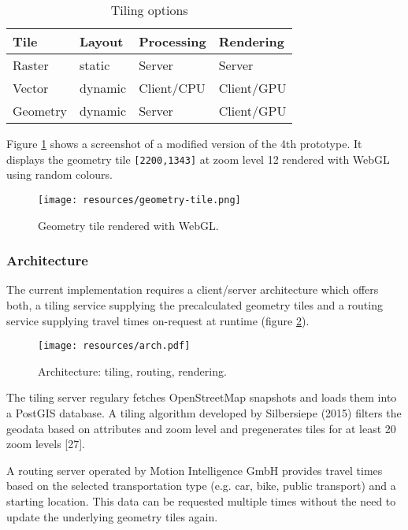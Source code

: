 \documentclass{motivation}
\begin{document}
  \begin{table}[!h]
    \centering
    \begin{tabular}{l|l|l|l}
      Tile & Layout & Processing & Rendering\\ \hline
      \cellcolor{yellow!15}Raster & \cellcolor{red!15}static & \cellcolor{green!15}Server & \cellcolor{red!15}Server\\
      \cellcolor{yellow!15}Vector & \cellcolor{green!15}dynamic & \cellcolor{red!15}Client/CPU & \cellcolor{green!15}Client/GPU\\
      \cellcolor{green!15}Geometry & \cellcolor{green!15}dynamic & \cellcolor{green!15}Server & \cellcolor{green!15}Client/GPU\\
    \end{tabular}
    \caption{Tiling options}
    \label{tab:tilopts}
  \end{table}
  Figure \ref{fig:geotile} shows a screenshot of a modified version of the 4th prototype. It displays the geometry tile \texttt{[2200,1343]} at zoom level 12 rendered with WebGL using random colours.

  \begin{figure}[h]
    \centering
    \texttt{[image: resources/geometry-tile.png]}
    \caption{Geometry tile rendered with WebGL.}
    \label{fig:geotile}
  \end{figure}

\subsubsection{Architecture}
  The current implementation requires a client/server architecture which offers both, a tiling service supplying the precalculated geometry tiles and a routing service supplying travel times on-request at runtime (figure \ref{fig:arch}).

  \begin{figure}[h]
    \centering
    \texttt{[image: resources/arch.pdf]}
    \caption{Architecture: tiling, routing, rendering.}
    \label{fig:arch}
  \end{figure}

  The tiling server regulary fetches OpenStreetMap snapshots and loads them into a PostGIS database. A tiling algorithm developed by Silbersiepe (2015) filters the geodata based on attributes and zoom level and pregenerates tiles for at least 20 zoom levels [27].\par
  A routing server operated by Motion Intelligence GmbH provides travel times based on the selected transportation type (e.g. car, bike, public transport) and a starting location. This data can be requested multiple times without the need to update the underlying geometry tiles again.
\end{document}
